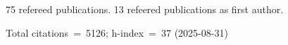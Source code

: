 75 refereed publications. 13 refeered publications as first author.

Total citations~=~5126; h-index~=~37 (2025-08-31)